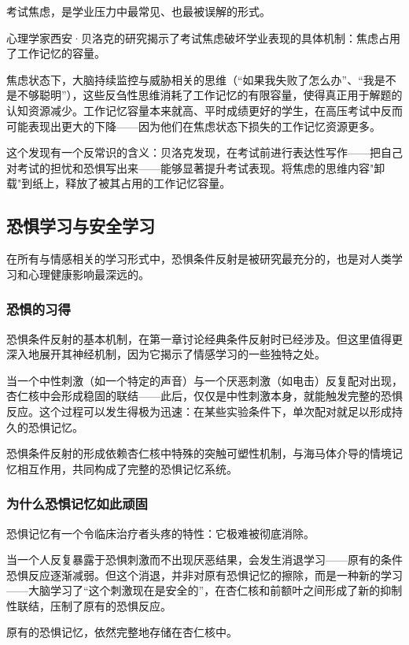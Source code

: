 \documentclass[11pt]{article}
\begin{document}
考试焦虑，是学业压力中最常见、也最被误解的形式。

心理学家西安·贝洛克的研究揭示了考试焦虑破坏学业表现的具体机制：焦虑占用了工作记忆的容量。

焦虑状态下，大脑持续监控与威胁相关的思维（“如果我失败了怎么办”、“我是不是不够聪明”），这些反刍性思维消耗了工作记忆的有限容量，使得真正用于解题的认知资源减少。工作记忆容量本来就高、平时成绩更好的学生，在高压考试中反而可能表现出更大的下降——因为他们在焦虑状态下损失的工作记忆资源更多。

这个发现有一个反常识的含义：贝洛克发现，在考试前进行表达性写作——把自己对考试的担忧和恐惧写出来——能够显著提升考试表现。将焦虑的思维内容"卸载"到纸上，释放了被其占用的工作记忆容量。
\subsection{恐惧学习与安全学习}
\label{sec:org77929e3}

在所有与情感相关的学习形式中，恐惧条件反射是被研究最充分的，也是对人类学习和心理健康影响最深远的。
\subsubsection{恐惧的习得}
\label{sec:org6cfc502}

恐惧条件反射的基本机制，在第一章讨论经典条件反射时已经涉及。但这里值得更深入地展开其神经机制，因为它揭示了情感学习的一些独特之处。

当一个中性刺激（如一个特定的声音）与一个厌恶刺激（如电击）反复配对出现，杏仁核中会形成稳固的联结——此后，仅仅是中性刺激本身，就能触发完整的恐惧反应。这个过程可以发生得极为迅速：在某些实验条件下，单次配对就足以形成持久的恐惧记忆。

恐惧条件反射的形成依赖杏仁核中特殊的突触可塑性机制，与海马体介导的情境记忆相互作用，共同构成了完整的恐惧记忆系统。
\subsubsection{为什么恐惧记忆如此顽固}
\label{sec:orgdcbb399}

恐惧记忆有一个令临床治疗者头疼的特性：它极难被彻底消除。

当一个人反复暴露于恐惧刺激而不出现厌恶结果，会发生消退学习——原有的条件恐惧反应逐渐减弱。但这个消退，并非对原有恐惧记忆的擦除，而是一种新的学习——大脑学习了“这个刺激现在是安全的”，在杏仁核和前额叶之间形成了新的抑制性联结，压制了原有的恐惧反应。

原有的恐惧记忆，依然完整地存储在杏仁核中。
\end{document}
